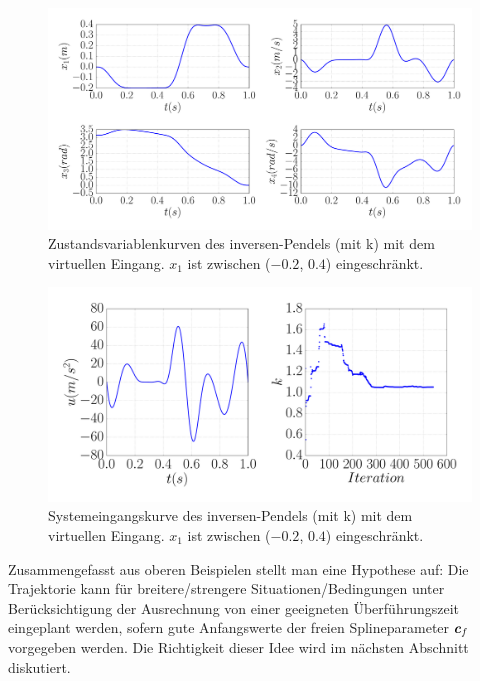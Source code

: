 \begin{beispiel}
	
	
	\begin{figure}[!h]
		\centering
		\includegraphics[width=0.8\linewidth]{bild/30_32/example0_mit_k_x_con.pdf}%
		\caption[Zustandsvariablenkurven des inversen-Pendels (mit k) mit dem virtuellen Eingang.]{Zustandsvariablenkurven des inversen-Pendels (mit k) mit dem virtuellen Eingang. $x_{1}$ ist zwischen ($-0.2$, $0.4$) eingeschränkt.}
		\label{fig:Inverses_Pendel_mit_k_x_con}
	\end{figure}
	
	\begin{figure}[!h]
		\centering
		\includegraphics[width=0.7\linewidth]{bild/30_32/example0_mit_k_u_con_makersize=10.pdf}%
		\caption[Systemeingangskurve des inversen-Pendels (mit k) mit dem virtuellen Eingang.]{Systemeingangskurve des inversen-Pendels (mit k) mit dem virtuellen Eingang. $x_{1}$ ist zwischen ($-0.2$, $0.4$) eingeschränkt.}
		\label{fig:Inverses_Pendel_mit_k_u_con}
	\end{figure}

\end{beispiel}

Zusammengefasst aus oberen Beispielen stellt man eine Hypothese auf: Die Trajektorie kann für breitere/strengere Situationen/Bedingungen unter Berücksichtigung der Ausrechnung von einer geeigneten Überführungszeit eingeplant werden, sofern gute Anfangswerte der freien Splineparameter $\boldsymbol c_{f}$ vorgegeben werden. Die Richtigkeit dieser Idee wird im nächsten Abschnitt diskutiert.

